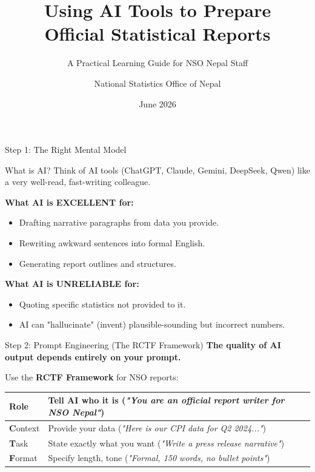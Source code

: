 \documentclass[aspectratio=169]{beamer}
\title[NSO Nepal AI Guide]{Using AI Tools to Prepare \\ Official Statistical Reports}
\subtitle{A Practical Learning Guide for NSO Nepal Staff}
\author[NSO Nepal]{National Statistics Office of Nepal}
\date{June 2026}
\begin{document}
\begin{frame}
    \titlepage
\end{frame}

\begin{frame}{Step 1: The Right Mental Model}
    \begin{block}{What is AI?}
        Think of AI tools (ChatGPT, Claude, Gemini, DeepSeek, Qwen) like a very well-read, fast-writing colleague.
    \end{block}
    
    \vspace{0.5cm}
    
    \textbf{What AI is EXCELLENT for:}
    \begin{itemize}
        \item Drafting narrative paragraphs from data you provide.
        \item Rewriting awkward sentences into formal English.
        \item Generating report outlines and structures.
    \end{itemize}
    
    \vspace{0.5cm}
    
    \textbf{What AI is UNRELIABLE for:}
    \begin{itemize}
        \item Quoting specific statistics not provided to it.
        \item AI can "hallucinate" (invent) plausible-sounding but incorrect numbers.
    \end{itemize}
\end{frame}

\begin{frame}{Step 2: Prompt Engineering (The RCTF Framework)}
    \textbf{The quality of AI output depends entirely on your prompt.}
    
    \vspace{0.5cm}
    
    Use the \textbf{RCTF Framework} for NSO reports:
    \begin{table}[]
        \centering
        \renewcommand{\arraystretch}{1.5}
        \begin{tabular}{|l|p{8cm}|}
            \hline
            \textbf{R}ole & Tell AI who it is (\textit{"You are an official report writer for NSO Nepal"}) \\ \hline
            \textbf{C}ontext & Provide your data (\textit{"Here is our CPI data for Q2 2024..."}) \\ \hline
            \textbf{T}ask & State exactly what you want (\textit{"Write a press release narrative"}) \\ \hline
            \textbf{F}ormat & Specify length, tone (\textit{"Formal, 150 words, no bullet points"}) \\ \hline
        \end{tabular}
    \end{table}
\end{frame}
\end{document}
